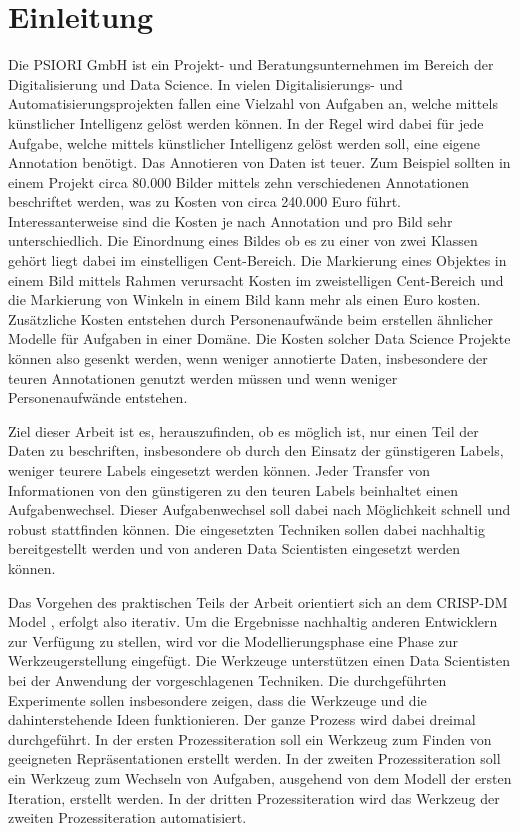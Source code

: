 \listoftodos

\chapter{Einleitung}
\label{chap:Einleitung}
	Die PSIORI GmbH \cite{PSIORIGmbH.2020} ist ein Projekt- und Beratungsunternehmen im Bereich der Digitalisierung und Data Science. In vielen Digitalisierungs- und Automatisierungsprojekten fallen eine Vielzahl von Aufgaben an, welche mittels künstlicher Intelligenz gelöst werden können. In der Regel wird dabei für jede Aufgabe, welche mittels künstlicher Intelligenz gelöst werden soll, eine eigene Annotation benötigt. Das Annotieren von Daten ist teuer. Zum Beispiel sollten in einem Projekt circa 80.000 Bilder mittels zehn verschiedenen Annotationen beschriftet werden, was zu Kosten von circa 240.000 Euro führt. Interessanterweise sind die Kosten je nach Annotation und pro Bild sehr unterschiedlich. Die Einordnung eines Bildes ob es zu einer von zwei Klassen gehört liegt dabei im einstelligen Cent-Bereich. Die Markierung eines Objektes in einem Bild mittels Rahmen verursacht Kosten im zweistelligen Cent-Bereich und die Markierung von Winkeln in einem Bild kann mehr als einen Euro kosten. Zusätzliche Kosten entstehen durch Personenaufwände beim erstellen ähnlicher Modelle für Aufgaben in einer Domäne. Die Kosten solcher Data Science Projekte können also gesenkt werden, wenn weniger annotierte Daten, insbesondere der teuren Annotationen genutzt werden müssen und wenn weniger Personenaufwände entstehen. 
	
	Ziel dieser Arbeit ist es, herauszufinden, ob es möglich ist, nur einen Teil der Daten zu beschriften, insbesondere ob durch den Einsatz der günstigeren Labels, weniger teurere Labels eingesetzt werden können. Jeder Transfer von Informationen von den günstigeren zu den teuren Labels beinhaltet einen Aufgabenwechsel. Dieser Aufgabenwechsel soll dabei nach Möglichkeit schnell und robust stattfinden können. Die eingesetzten Techniken sollen dabei nachhaltig bereitgestellt werden und von anderen Data Scientisten eingesetzt werden können. 
	
	Das Vorgehen des praktischen Teils der Arbeit orientiert sich an dem CRISP-DM Model \cite{Shearer.2000}, erfolgt also iterativ. Um die Ergebnisse nachhaltig anderen Entwicklern zur Verfügung zu stellen, wird vor die Modellierungsphase eine Phase zur Werkzeugerstellung eingefügt. Die Werkzeuge unterstützen einen Data Scientisten bei der Anwendung der vorgeschlagenen Techniken. Die durchgeführten Experimente sollen insbesondere zeigen, dass die Werkzeuge und die dahinterstehende Ideen funktionieren. Der ganze Prozess wird dabei dreimal durchgeführt. In der ersten Prozessiteration soll ein Werkzeug zum Finden von geeigneten Repräsentationen erstellt werden. In der zweiten Prozessiteration soll ein Werkzeug zum Wechseln von Aufgaben, ausgehend von dem Modell der ersten Iteration, erstellt werden. In der dritten Prozessiteration wird das Werkzeug der zweiten Prozessiteration automatisiert.
	
